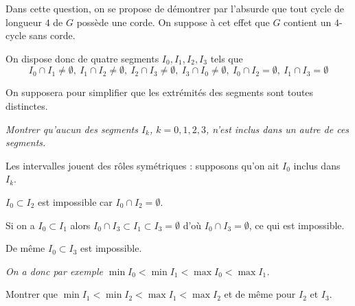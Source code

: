 Dans cette question, on se propose de démontrer par l'absurde que tout cycle de longueur $4$ de $G$ possède une corde. On suppose à cet effet que $G$ contient un $4$-cycle sans corde.

On dispose donc de quatre segments $I_0,I_1,I_2,I_3$ tels que 
\[I_0\cap I_1\ne \emptyset,\ I_1\cap I_2\ne \emptyset,\ I_2\cap I_3\ne \emptyset,\ I_3\cap I_0\ne \emptyset,\ I_0\cap I_2 = \emptyset,\ I_1\cap I_3 = \emptyset\]

On supposera pour simplifier que les extrémités des segments sont toutes distinctes.
\begin{Exercise}\it
Montrer qu'aucun des segments $I_k$, $k=0,1,2,3$, n'est inclus dans un autre de ces segments.
\end{Exercise}  
\begin{Answer}

Les intervalles jouent des rôles symétriques : supposons qu'on ait $I_0$ inclus dans $I_k$.

$I_0\subset I_2$ est impossible car $I_0\cap I_2=\emptyset$.

Si on a $I_0\subset I_1$ alors $I_0\cap I_3\subset I_1\subset I_3=\emptyset$ d'où $I_0\cap I_3 = \emptyset$, ce qui est impossible. 

De même $I_0\subset I_3$ est impossible.
\end{Answer}
\begin{Exercise}\it
On a donc par exemple $\min I_0 < \min I_1 < \max I_0 < \max I_1$. 

Montrer que $\min  I_1 < \min I_2 < \max I_1 < \max I_2$ et de même pour $I_2$ et $I_3$.
\end{Exercise}  
